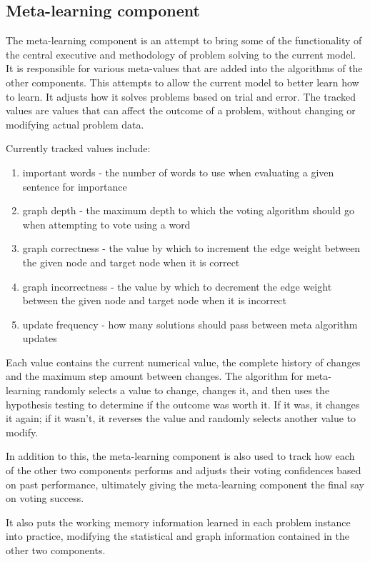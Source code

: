 \subsection{Meta-learning component} 

The meta-learning component is an attempt
to bring some of the functionality of the central executive and methodology of
problem solving to the current model. It is responsible for various meta-values
that are added into the algorithms of the other components.  This attempts to 
allow the current model to better learn how to learn. It adjusts how it  
solves problems based on trial and error. The tracked values are values that can affect 
the outcome of a problem, without changing or modifying actual problem data.

Currently tracked values include:

\begin{enumerate}     
	\item important words - the number of words to use when evaluating a given 
	sentence for importance     
	\item graph depth - the maximum depth to which the voting algorithm should go when 
	attempting to vote using a word 
	\item graph correctness - the value by which to increment the edge weight 
	between the given node and target node when it is correct     
	\item graph incorrectness - the value by which to decrement the edge weight 
	between the given node and target node when it is incorrect     
	\item update frequency - how many solutions should pass between meta 
	algorithm updates 
\end{enumerate}

Each value contains the current numerical value, the complete history of changes
and the maximum step amount between changes.  The algorithm for meta-learning 
randomly selects a value to change, changes it, and then uses the hypothesis
testing to determine if the outcome was worth it. If it was, it changes it again; 
if it wasn't, it reverses the value and randomly selects another value to
modify.

In addition to this, the meta-learning component is also used to track how each
of the other two components performs and adjusts their voting confidences
based on past performance, ultimately giving the meta-learning component the final
say on voting success.

It also puts the working memory information learned in each problem instance
into practice, modifying the statistical and graph information contained in the
other two components.

